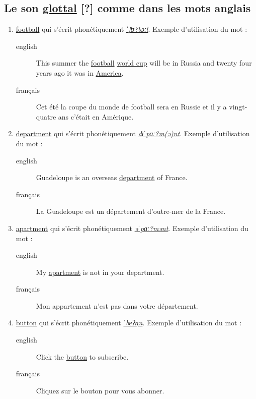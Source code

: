 \documentclass[12pt,a4paper]{book}
\begin{document}
\subsection{Le son \href{https://en.wikipedia.org/wiki/Glottal\_stop}{glottal} [?] comme dans les mots anglais}
\label{sec:org630b613}
\begin{enumerate}
\item \href{http://www.wordreference.com/enfr/football}{football} qui s'écrit phonétiquement \href{https://www.phon.ucl.ac.uk/home/wells/phoneticsymbolsforenglish.htm}{\emph{ˈfʊ?bɔːl}}. Exemple d'utilisation du mot :
\begin{description}
\item[{english}] \textenglish{This summer the \href{https://youtu.be/6v5Ao0tYhBw}{football} \href{https://youtu.be/zVr3dTMY9Ag}{world cup} will be in Russia
and twenty four years ago it was in \href{https://youtu.be/mAYvjOzh1ag}{America}.}
\item[{français}] Cet été la coupe du monde de football sera en Russie
et il y a vingt-quatre ans c'était en Amérique.
\end{description}
\item \href{http://www.wordreference.com/enfr/department}{department} qui s'écrit phonétiquement \href{https://en.oxforddictionaries.com/definition/department}{\emph{dɪˈpɑː?m(ə)nt}}. Exemple d'utilisation du mot :
\begin{description}
\item[{english}] \textenglish{Guadeloupe is an overseas \href{https://youtu.be/0CUWPGLVRoU}{department} of France.}
\item[{français}] La Guadeloupe est un département d'outre-mer de la
France.
\end{description}
\item \href{http://www.wordreference.com/enfr/apartment}{apartment} qui s'écrit phonétiquement \href{https://tophonetics.com/}{\emph{əˈpɑː?mənt}}. Exemple d'utilisation du mot :
\begin{description}
\item[{english}] \textenglish{My \href{https://youtu.be/H0HjU9956Z8}{apartment} is not in your department.}
\item[{français}] Mon appartement n'est pas dans votre département.
\end{description}
\item \href{http://www.wordreference.com/enfr/button}{button} qui s'écrit phonétiquement \href{https://en.wikipedia.org/wiki/Glottal\_stop}{\emph{ˈbɐʔn̩n}}. Exemple d'utilisation du mot :
\begin{description}
\item[{english}] \textenglish{Click the \href{https://youtu.be/IJcwc5Gz8K0}{button} to subscribe.}
\item[{français}] Cliquez sur le bouton pour vous abonner.
\end{description}
\end{enumerate}
\end{document}
